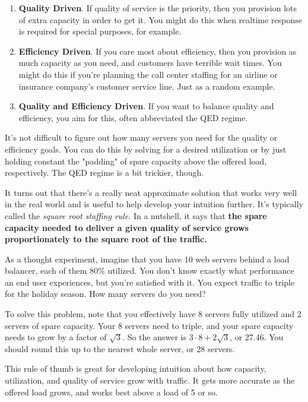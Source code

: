 \documentclass{vivid_layout}
\begin{document}
\begin{enumerate}
\item {\bfseries Quality Driven}. If quality of service is the priority, then
you provision lots of extra capacity in order to get it. You might do this when
realtime response is required for special purposes, for example.
\item {\bfseries Efficiency Driven}. If you care most about efficiency, then you
provision as much capacity as you need, and customers have terrible wait times.
You might do this if you're planning the call center staffing for an airline or
insurance company's customer service line. Just as a random example.
\item {\bfseries Quality and Efficiency Driven}. If you want to balance quality
and efficiency, you aim for this, often abbreviated the QED regime.
\end{enumerate}

It's not difficult to figure out how many servers you need for the quality or
efficiency goals. You can do this by solving for a desired utilization or by
just holding constant the "padding" of spare capacity above the offered load,
respectively. The QED regime is a bit trickier, though.

It turns out that there's a really neat approximate solution that works very
well in the real world and is useful to help develop your intuition further.
It's typically called the {\itshape square root staffing rule}. In a nutshell,
it says that {\bfseries the spare capacity needed to deliver a given quality of
service grows proportionately to the square root of the traffic.}

As a thought experiment, imagine that you have 10 web servers behind a load
balancer, each of them 80\% utilized. You don't know exactly what performance an
end user experiences, but you're satisfied with it. You expect traffic to triple
for the holiday season. How many servers do you need?

To solve this problem, note that you effectively have 8 servers fully utilized
and 2 servers of spare capacity. Your 8 servers need to triple, and your spare
capacity needs to grow by a factor of \( \sqrt{3} \). So the answer is \(
3\cdot8 + 2\sqrt{3} \), or 27.46. You should round this up to the nearest whole
server, or 28 servers.

This rule of thumb is great for developing intuition about how capacity,
utilization, and quality of service grow with traffic. It gets more accurate as
the offered load grows, and works best above a load of 5 or so.
\end{document}
